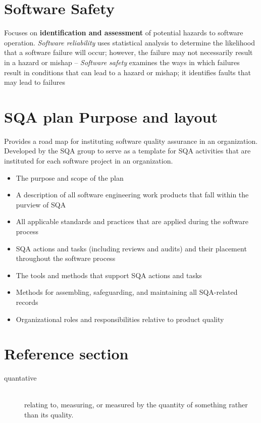 \documentclass{article}
\begin{document}
\section{Software Safety}
\begin{flushleft}
Focuses on \textbf{identification and assessment} of potential hazards to software operation. \textit{Software reliability} uses statistical analysis to determine the likelihood that a software failure will occur; however, the failure may not necessarily result in a hazard or mishap – \textit{Software safety} examines the ways in which failures result in conditions that can lead to a hazard or mishap; it identifies faults that may lead to failures
\end{flushleft}

\section{SQA plan Purpose and layout}
\begin{flushleft}
Provides a road map for instituting software quality assurance in an organization. Developed by the SQA group to serve as a template for SQA activities that are instituted for each software project in an organization.
\end{flushleft}
\begin{itemize}
  \item The purpose and scope of the plan
  \item A description of all software engineering work products that fall within the purview of SQA
  \item All applicable standards and practices that are applied during the software process
  \item SQA actions and tasks (including reviews and audits) and their placement throughout the software process 
  \item The tools and methods that support SQA actions and tasks
  \item Methods for assembling, safeguarding, and maintaining all SQA-related records
  \item Organizational roles and responsibilities relative to product quality
\end{itemize}

\pagebreak
\section*{Reference section} \label{sec:reference}
\begin{description}
	\item[quantative] \hfill \\ relating to, measuring, or measured by the quantity of something rather than its quality.
\end{description}
\end{document}
